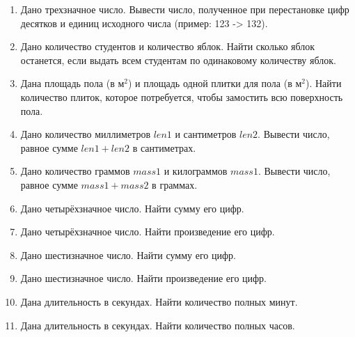 \documentclass[main.tex]{subfiles}
\begin{document}
\begin{enumerate}
    \item Дано трехзначное число. Вывести число, полученное при перестановке цифр десятков и единиц исходного числа (пример: 123 -> 132).
    \item Дано количество студентов и количество яблок. Найти сколько яблок останется, если выдать всем студентам по одинаковому количеству яблок.
    \item Дана площадь пола (в м$^2$) и площадь одной плитки для пола (в м$^2$). Найти количество плиток, которое потребуется, чтобы замостить всю поверхность пола.
    \item Дано количество миллиметров $len1$ и сантиметров $len2$. Вывести число, равное сумме $len1 + len2$ в сантиметрах.
    \item Дано количество граммов $mass1$ и килограммов $mass1$. Вывести число, равное сумме $mass1 + mass2$ в граммах.
    \item Дано четырёхзначное число. Найти сумму его цифр.
    \item Дано четырёхзначное число. Найти произведение его цифр.
    \item Дано шестизначное число. Найти сумму его цифр.
    \item Дано шестизначное число. Найти произведение его цифр.
    \item Дана длительность в секундах. Найти количество полных минут.
    \item Дана длительность в секундах. Найти количество полных часов.
\end{enumerate}
\end{document}
